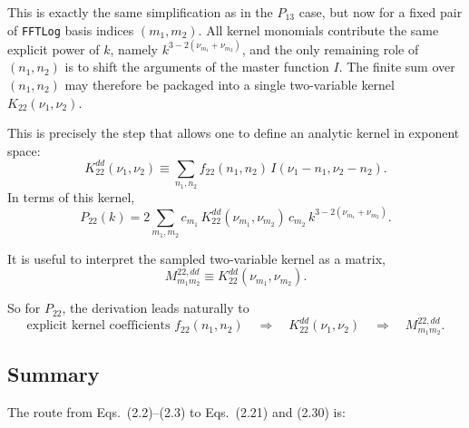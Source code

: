 \documentclass[a4paper,11pt]{article}
\newcommand{\codefont}[1]{{\texttt{#1}}}
\newcommand{\<}{\langle}
\renewcommand{\>}{\rangle}
\begin{document}
This is exactly the same simplification as in the \(P_{13}\) case, but now for a fixed pair of
\codefont{FFTLog} basis indices \((m_1,m_2)\). All kernel monomials contribute the same explicit
power of \(k\), namely \(k^{3-2(\nu_{m_1}+\nu_{m_2})}\), and the only remaining role of
\((n_1,n_2)\) is to shift the arguments of the master function \(I\). The finite sum over
\((n_1,n_2)\) may therefore be packaged into a single two-variable kernel \(K_{22}(\nu_1,\nu_2)\).

This is precisely the step that allows one to define an analytic kernel in exponent space:
\begin{equation}
K_{22}^{dd}(\nu_1,\nu_2)
\equiv
\sum_{n_1,n_2}
f_{22}(n_1,n_2)\,
I(\nu_1-n_1,\nu_2-n_2).
\label{eq:K22dd}
\end{equation}
In terms of this kernel,
\begin{equation}
P_{22}(k)
=
2\sum_{m_1,m_2}
c_{m_1}\,
K_{22}^{dd}(\nu_{m_1},\nu_{m_2})\,
c_{m_2}\,
k^{3-2(\nu_{m_1}+\nu_{m_2})}.
\label{eq:P22_kernel_form}
\end{equation}

It is useful to interpret the sampled two-variable kernel as a matrix,
\begin{equation}
M_{m_1m_2}^{22,dd}
\equiv
K_{22}^{dd}(\nu_{m_1},\nu_{m_2}).
\label{eq:M22dd}
\end{equation}

So for \(P_{22}\), the derivation leads naturally to
\[
\text{explicit kernel coefficients } f_{22}(n_1,n_2)
\quad\Longrightarrow\quad
K_{22}^{dd}(\nu_1,\nu_2)
\quad\Longrightarrow\quad
M_{m_1m_2}^{22,dd}.
\]

\subsection{Summary}

The route from Eqs.~(2.2)–(2.3) to Eqs.~(2.21) and (2.30) is:
\end{document}
